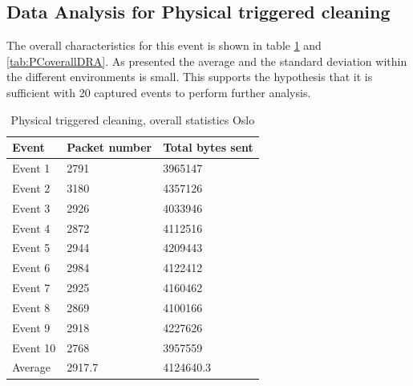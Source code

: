 \subsection{Data Analysis for Physical triggered cleaning}
The overall characteristics for this event is shown in table \ref{tab:PCoverallOSL} and \ref{tab:PCoverallDRA}. As presented the average and the standard deviation within the different environments is small. This supports the hypothesis that it is sufficient with 20 captured events to perform further analysis.
\begin{table}[H]
\centering
\caption{Physical triggered cleaning, overall statistics Oslo}
\label{tab:PCoverallOSL}
\begin{tabular}{|l|l|l|}
\hline
\textbf{Event} & \textbf{Packet number} & \textbf{Total bytes sent} \\ \hline
Event 1        & 2791                   & 3965147                   \\ \hline
Event 2        & 3180                   & 4357126                   \\ \hline
Event 3        & 2926                   & 4033946                   \\ \hline
Event 4        & 2872                   & 4112516                   \\ \hline
Event 5        & 2944                   & 4209443                   \\ \hline
Event 6        & 2984                   & 4122412                   \\ \hline
Event 7        & 2925                   & 4160462                   \\ \hline
Event 8        & 2869                   & 4100166                   \\ \hline
Event 9        & 2918                   & 4227626                   \\ \hline
Event 10       & 2768                   & 3957559                   \\ \hline
Average        & 2917.7                 & 4124640.3                 \\ \hline
\end{tabular}
\end{table}

